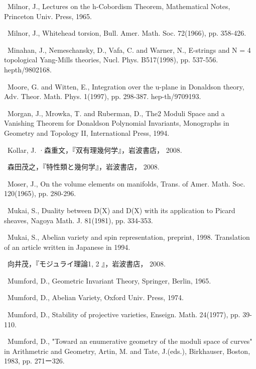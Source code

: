 {\noindent [258]\ Milnor, J., Lectures on the h-Cobordism Theorem, Mathematical Notes, Princeton Univ. Press, 1965.\par\smallskip
\noindent [259]\ Milnor, J., Whitehead torsion, Bull. Amer. Math. Soc. 72(1966), pp. 358-426.\par\smallskip
\noindent [260]\ Minahan, J., Nemeschansky, D., Vafa, C. and Warner, N., E-strings and N = 4 topological Yang-Mills theories, Nucl. Phys. B517(1998), pp. 537-556. hepth/9802168.\par\smallskip
\noindent [261]\ Moore, G. and Witten, E., Integration over the u-plane in Donaldson theory, Adv. Theor. Math. Phys. 1(1997), pp. 298-387. hep-th/9709193.\par\smallskip
\noindent [262]\ Morgan, J., Mrowka, T. and Ruberman, D., The2 Moduli Space and a Vanishing Theorem for Donaldson Polynomial Invariants, Monographs in Geometry and Topology II, International Press, 1994.\par\smallskip
\noindent [263]\ Kollar, J. ·森重文，『双有理幾何学』，岩波書店， 2008.\par\smallskip
\noindent [264]\ 森田茂之，『特性類と幾何学』，岩波書店， 2008.\par\smallskip
\noindent [265]\ Moser, J., On the volume elements on manifolds, Trans. of Amer. Math. Soc. 120(1965), pp. 280-296.\par\smallskip
\noindent [266]\ Mukai, S., Duality between D(X) and D(X) with its application to Picard sheaves, Nagoya Math. J. 81(1981), pp. 334-353.\par\smallskip
\noindent [267]\ Mukai, S., Abelian variety and spin representation, preprint, 1998. Translation of an article written in Japanese in 1994.\par\smallskip
\noindent [268]\ 向井茂，『モジュライ理論1, 2 』，岩波書店， 2008.\par\smallskip
\noindent [269]\ Mumford, D., Geometric Invariant Theory, Springer, Berlin, 1965.\par\smallskip
\noindent [270]\ Mumford, D., Abelian Variety, Oxford Univ. Press, 1974.\par\smallskip
\noindent [271]\ Mumford, D., Stability of projective varieties, Enseign. Math. 24(1977), pp. 39-110.\par\smallskip
\noindent [272]\ Mumford, D., "Toward an enumerative geometry of the moduli space of curves" in Arithmetric and Geometry, Artin, M. and Tate, J.(eds.), Birkhauser, Boston, 1983, pp. 271ー326.\par\smallskip
}
